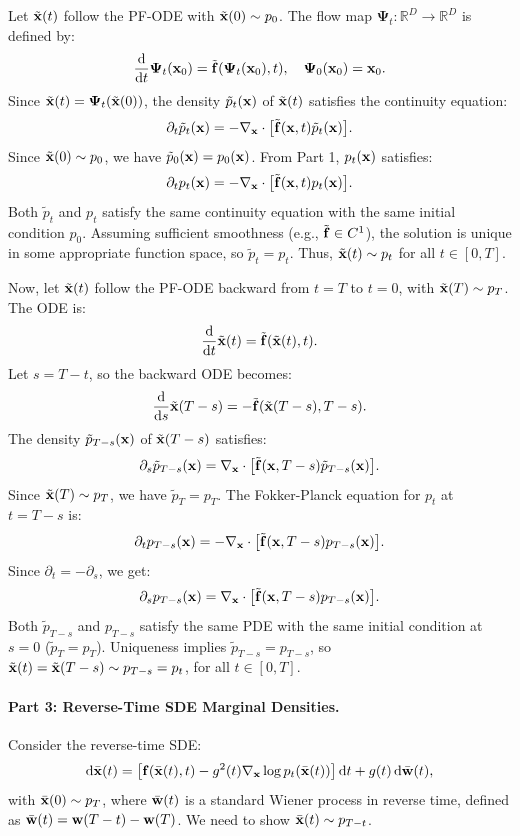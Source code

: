  Let $\tilde{{\mathbf{x}}}(t)$ follow the PF-ODE with $\tilde{{\mathbf{x}}}(0) \sim p_0$. The flow map $\bm{\Psi}_t: \mathbb{R}^D \to \mathbb{R}^D$ is defined by:
\[
\frac{\mathop{}\!\mathrm{d}}{\mathop{}\!\mathrm{d} t} \bm{\Psi}_t(\mathbf{x}_0) = \tilde {{\mathbf{f}}}(\bm{\Psi}_t(\mathbf{x}_0), t), \quad \bm{\Psi}_0(\mathbf{x}_0) = \mathbf{x}_0.
\]
Since $\tilde{{\mathbf{x}}}(t) = \bm{\Psi}_t(\tilde{{\mathbf{x}}}(0))$, the density $\tilde p_t({\mathbf{x}})$ of $\tilde{{\mathbf{x}}}(t)$ satisfies the continuity equation:
\[
\partial_t \tilde p_t({\mathbf{x}}) = -\nabla_{{\mathbf{x}}} \cdot \bigl[ \tilde {{\mathbf{f}}}({\mathbf{x}}, t) \tilde p_t({\mathbf{x}}) \bigr].
\]
Since $\tilde{{\mathbf{x}}}(0) \sim p_0$, we have $\tilde p_0({\mathbf{x}}) = p_0({\mathbf{x}})$. From Part 1, $p_t({\mathbf{x}})$ satisfies:
\[
\partial_t p_t({\mathbf{x}}) = -\nabla_{{\mathbf{x}}} \cdot \bigl[ \tilde {{\mathbf{f}}}({\mathbf{x}}, t) p_t({\mathbf{x}}) \bigr].
\]
Both $\tilde p_t$ and $p_t$ satisfy the same continuity equation with the same initial condition $p_0$. Assuming sufficient smoothness (e.g., $\tilde {{\mathbf{f}}} \in C^1$), the solution is unique in some appropriate function space, so $\tilde p_t = p_t$. Thus, $\tilde{{\mathbf{x}}}(t) \sim p_t$ for all $t \in [0, T]$.

\vspace{0.3cm}
 Now, let $\tilde{{\mathbf{x}}}(t)$ follow the PF-ODE backward from $t = T$ to $t = 0$, with $\tilde{{\mathbf{x}}}(T) \sim p_T$. The ODE is:
\[
\frac{\mathop{}\!\mathrm{d}}{\mathop{}\!\mathrm{d} t} \tilde{{\mathbf{x}}}(t) = \tilde {{\mathbf{f}}}(\tilde{{\mathbf{x}}}(t), t).
\]
Let $s = T - t$, so the backward ODE becomes:
\[
\frac{\mathop{}\!\mathrm{d}}{\mathop{}\!\mathrm{d} s} \tilde{{\mathbf{x}}}(T - s) = -\tilde {{\mathbf{f}}}(\tilde{{\mathbf{x}}}(T - s), T - s).
\]
The density $\tilde p_{T-s}({\mathbf{x}})$ of $\tilde{{\mathbf{x}}}(T - s)$ satisfies:
\[
\partial_s \tilde p_{T-s}({\mathbf{x}}) = \nabla_{{\mathbf{x}}} \cdot \bigl[ \tilde {{\mathbf{f}}}({\mathbf{x}}, T - s) \tilde p_{T-s}({\mathbf{x}}) \bigr].
\]
Since $\tilde{{\mathbf{x}}}(T) \sim p_T$, we have $\tilde p_T = p_T$. The Fokker-Planck equation for $p_t$ at $t = T - s$ is:
\[
\partial_t p_{T-s}({\mathbf{x}}) = -\nabla_{{\mathbf{x}}} \cdot \bigl[ \tilde {{\mathbf{f}}}({\mathbf{x}}, T - s) p_{T-s}({\mathbf{x}}) \bigr].
\]
Since $\partial_t = -\partial_s$, we get:
\[
\partial_s p_{T-s}({\mathbf{x}}) = \nabla_{{\mathbf{x}}} \cdot \bigl[ \tilde {{\mathbf{f}}}({\mathbf{x}}, T - s) p_{T-s}({\mathbf{x}}) \bigr].
\]
Both $\tilde p_{T-s}$ and $p_{T-s}$ satisfy the same PDE with the same initial condition at $s = 0$ ($\tilde p_T = p_T$). Uniqueness implies $\tilde p_{T-s} = p_{T-s}$, so $\tilde{{\mathbf{x}}}(t) = \tilde{{\mathbf{x}}}(T - s) \sim p_{T-s} = p_t$, for all $t \in [0, T]$.

\paragraph{Part 3: Reverse-Time SDE Marginal Densities.}
Consider the reverse-time SDE:
\[
\mathop{}\!\mathrm{d} \bar{{\mathbf{x}}}(t) = \bigl[ {\mathbf{f}}(\bar{{\mathbf{x}}}(t), t) - g^2(t) \nabla_{{\mathbf{x}}} \log p_t(\bar{{\mathbf{x}}}(t)) \bigr] \mathop{}\!\mathrm{d} t + g(t) \mathop{}\!\mathrm{d} \bar{{\mathbf{w}}}(t),
\]
with $\bar{{\mathbf{x}}}(0) \sim p_T$, where $\bar{{\mathbf{w}}}(t)$ is a standard Wiener process in reverse time, defined as $\bar{{\mathbf{w}}}(t) = {\mathbf{w}}(T - t) - {\mathbf{w}}(T)$. We need to show $\bar{{\mathbf{x}}}(t) \sim p_{T-t}$.

